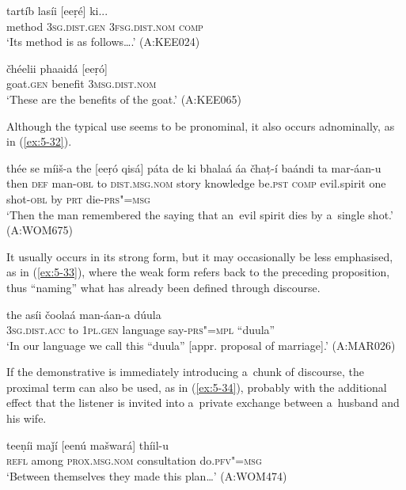 \begin{exe}
\ex
\label{ex:5-30}
\gll tartíb lasíi [eeṛé] ki...\\
method \textsc{3sg}.\textsc{dist.gen} \textsc{3fsg}.\textsc{dist.nom} \textsc{comp}\\
\glt `Its method is as follows{\ldots}.' (A:KEE024)

\ex
\label{ex:5-31}
\gll čhéelii phaaidá [eeṛó]\\
goat.\textsc{gen} benefit \textsc{3msg}.\textsc{dist.nom}\\
\glt `These are the benefits of the goat.' (A:KEE065)
\end{exe}
Although the typical use seems to be pronominal, it also occurs adnominally, as in (\ref{ex:5-32}).
\begin{exe}
\ex
\label{ex:5-32}
\gll thée se míiš-a the [eeṛó qisá] páta de ki bhalaá áa čhaṭ-í baándi ta mar-áan-u\\
then \textsc{def} man-\textsc{obl} to \textsc{dist.msg.nom} story knowledge be.\textsc{pst} \textsc{comp} evil.spirit one shot-\textsc{obl} by \textsc{prt} die-\textsc{prs"=msg}\\
\glt `Then the man remembered the saying that an~evil spirit dies by a~single shot.' (A:WOM675)
\end{exe}
It usually occurs in its strong form, but it may occasionally be less emphasised, as in (\ref{ex:5-33}), where the weak form refers back to the preceding proposition, thus ``naming'' what has already been defined through discourse.
\begin{exe}
\ex
\label{ex:5-33}
\gll [las] the asíi čoolaá man-áan-a dúula\\
\textsc{3sg}.\textsc{dist.acc} to \textsc{1pl.gen} language say-\textsc{prs"=mpl} ``duula''\\
\glt `In our language we call this ``duula'' [appr. proposal of marriage].' (A:MAR026)
\end{exe}
If the demonstrative is immediately introducing a~chunk of discourse, the proximal term can also be used, as in (\ref{ex:5-34}), probably with the additional effect that the listener is invited into a~private exchange between a~husband and his wife.
\begin{exe}
\ex
\label{ex:5-34}
\gll teeṇíi maǰí [eenú mašwará] thíil-u \\
\textsc{refl} among \textsc{prox.msg.nom} consultation do.\textsc{pfv"=msg}\\
\glt `Between themselves they made this plan{\ldots}' (A:WOM474)
\end{exe}
